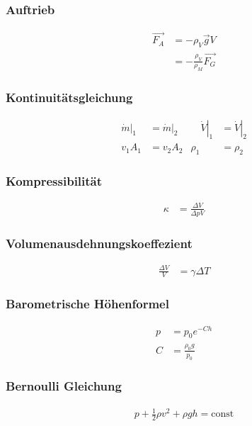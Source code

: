 \begin{multicols}{2}
\subsubsection{Auftrieb}
\begin{align*}
\vec{F_A}&=-\rho_V \vec{g} V\\
&=-\frac{\rho_V}{\rho_M}\vec{F_G}
\end{align*}

\subsubsection{Kontinuitätsgleichung}
\begin{alignat*}{2}
\left.\dot{m}\right|_1&=\left.\dot{m}\right|_2 & \quad \left.\dot{V}\right|_1&=\left.\dot{V}\right|_2\\
v_1A_1&=v_2A_2 & \rho_1&=\rho_2
\end{alignat*}
\end{multicols}

\begin{multicols}{2}{}
\subsubsection{Kompressibilität}
\begin{align*}
\kappa&=\frac{\Delta V}{\Delta p V}
\end{align*}


\subsubsection{Volumenausdehnungskoeffezient}
\begin{align*}
\frac{\Delta V}{V}&= \gamma \Delta T
\end{align*}


\subsubsection{Barometrische Höhenformel}
\begin{align*}
p&=p_0 e^{-Ch}\\
C&=\frac{\rho_0 g}{p_0}
\end{align*}


\subsubsection{Bernoulli Gleichung}
\begin{align*}
p+\frac{1}{2}\rho v^2+ \rho g h= \text{const}
\end{align*}
\end{multicols}


